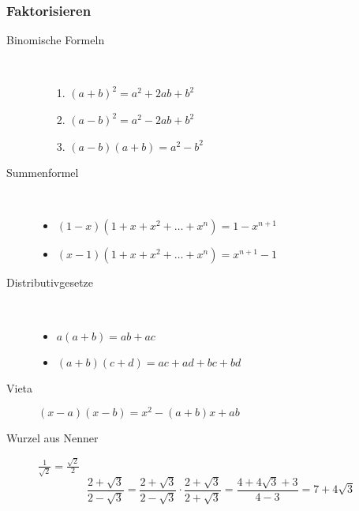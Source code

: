 \documentclass[12pt,a4paper]{article}
\begin{document}
\subsubsection{Faktorisieren}
\begin{description}
	\item[Binomische Formeln] \
		\begin{itemize}
			\item[1.] $(a+b)^2=a^2+2ab+b^2$
			\item[2.] $(a-b)^2=a^2-2ab+b^2$
			\item[3.] $(a-b)(a+b)=a^2-b^2$
		\end{itemize}
	\item[Summenformel] \
		\begin{itemize}
			\item $(1-x)(1+x+x^2+\dots +x^n)=1-x^{n+1}$
			\item $(x-1)(1+x+x^2+\dots +x^n)=x^{n+1}-1$
		\end{itemize}
	\item[Distributivgesetze] \
		\begin{itemize}
			\item $a(a+b)=ab+ac$
			\item $(a+b)(c+d) = ac +ad + bc +bd$
		\end{itemize}
	\item[Vieta] $(x-a)(x-b) = x^2 - (a+b)x+ab$
	\item[Wurzel aus Nenner] $\frac{1}{\sqrt{2}}=\frac{\sqrt{2}}{2}$
		$$\frac{2+\sqrt{3}}{2-\sqrt{3}}=\frac{2+\sqrt{3}}{2-\sqrt{3}} \cdot \frac{2+\sqrt{3}}{2+\sqrt{3}}=\frac{4+4\sqrt{3}+3}{4-3}=7+4\sqrt{3}$$
\end{description}
\end{document}
